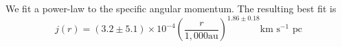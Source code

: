 We fit a power-law to the specific angular momentum. 
The resulting best fit is 
\begin{equation}
j(r) = (3.2\pm5.1)\times 10^{-4}\left( \frac{r}{1,000 \textrm{au}}\right)^{1.86\pm0.18} \textrm{km s$^{-1}$ pc}
\end{equation}
  
  
  
